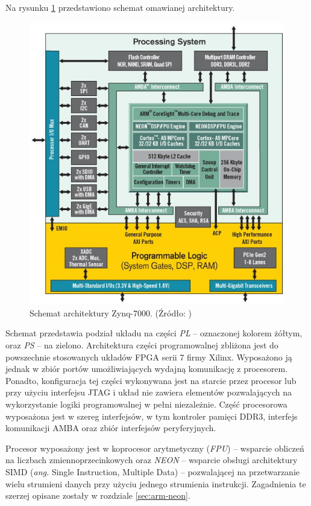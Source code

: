 Na rysunku \ref{fig:zynq-overview} przedstawiono schemat omawianej architektury.

\begin{figure}[H]
	\centering
	\includegraphics[width=12cm]{img/zyng-platform.png}
	\caption{Schemat architektury Zynq-7000. (Źródło: \cite{zybo-reference-manual})}
	\label{fig:zynq-overview}
\end{figure}


Schemat przedstawia podział układu na części \emph{PL} -- oznaczonej kolorem żółtym, oraz \emph{PS} -- na zielono.
Architektura części programowalnej zbliżona jest do powszechnie stosowanych układów FPGA serii 7 firmy Xilinx.
Wyposażono ją jednak w zbiór portów umożliwiających wydajną komunikację z procesorem. 
Ponadto, konfiguracja tej części wykonywana jest na starcie przez procesor lub przy użyciu interfejsu JTAG i układ nie zawiera elementów pozwalających na wykorzystanie logiki programowalnej w pełni niezależnie.
Część procesorowa wyposażona jest w szereg interfejsów, w tym kontroler pamięci DDR3, interfejs komunikacji AMBA oraz zbiór interfejsów peryferyjnych.

Procesor wyposażony jest w koprocesor arytmetyczny (\emph{FPU}) -- wsparcie obliczeń  na liczbach zmiennoprzecinkowych oraz \emph{NEON} -- wsparcie obsługi architektury SIMD (\emph{ang.} Single Instruction, Multiple Data) -- pozwalającej na przetwarzanie wielu strumieni danych przy użyciu jednego strumienia instrukcji. 
Zagadnienia te szerzej opisane zostały w rozdziale \ref{sec:arm-neon}.


